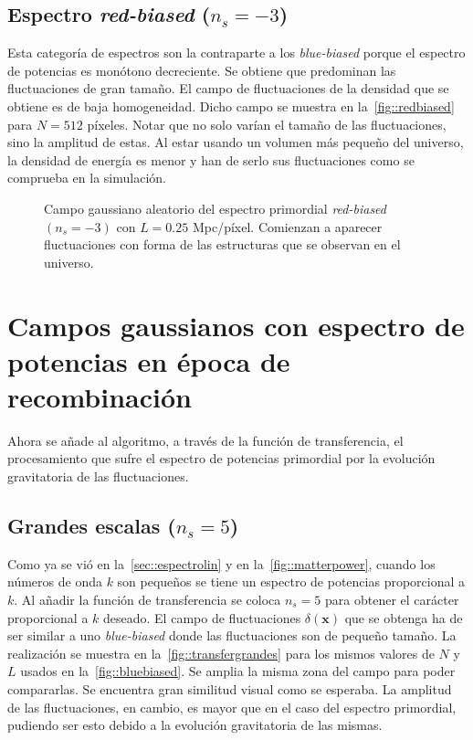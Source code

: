 \subsection{Espectro \textit{red-biased} (\texorpdfstring{\(n_s=-3\)}{ns=-3})}
Esta categoría de espectros son la contraparte a los \textit{blue-biased} porque el espectro de potencias es monótono decreciente. Se obtiene que predominan las fluctuaciones de gran tamaño. El campo de fluctuaciones de la densidad que se obtiene es de baja homogeneidad. Dicho campo se muestra en la~\autoref{fig::redbiased} para \(N=512\) píxeles. Notar que no solo varían el tamaño de las fluctuaciones, sino la amplitud de estas. Al estar usando un volumen más pequeño del universo, la densidad de energía es menor y han de serlo sus fluctuaciones como se comprueba en la simulación.
\begin{figure}[h!]
    \centering
    {}
    \caption[Espectro primordial \textit{red-biased} \(N=512\) píxeles y \(L=0.25\) Mpc/píxel]{Campo gaussiano aleatorio del espectro primordial \textit{red-biased} \((n_s=-3)\) con \(L=0.25\) Mpc/píxel. Comienzan a aparecer fluctuaciones con forma de las estructuras que se observan en el universo.}
    \label{fig::redbiased}
\end{figure}
\clearpage
\section{Campos gaussianos con espectro de potencias en época de recombinación}
Ahora se añade al algoritmo, a través de la función de transferencia, el procesamiento que sufre el espectro de potencias primordial por la evolución gravitatoria de las fluctuaciones.
\subsection{Grandes escalas (\texorpdfstring{\(n_s=5\)}{ns=5})}
Como ya se vió en la~\autoref{sec::espectrolin} y en la~\autoref{fig::matterpower}, cuando los números de onda \(k\) son pequeños se tiene un espectro de potencias proporcional a \(k\). Al añadir la función de transferencia se coloca \(n_s=5\) para obtener el carácter proporcional a \(k\) deseado. El campo de fluctuaciones \(\delta(\symbf{x})\) que se obtenga ha de ser similar a uno \textit{blue-biased} donde las fluctuaciones son de pequeño tamaño. La realización se muestra en la~\autoref{fig::transfergrandes} para los mismos valores de \(N\) y \(L\) usados en la~\autoref{fig::bluebiased}. Se amplia la misma zona del campo para poder compararlas. Se encuentra gran similitud visual como se esperaba. La amplitud de las fluctuaciones, en cambio, es mayor que en el caso del espectro primordial, pudiendo ser esto debido a la evolución gravitatoria de las mismas.

